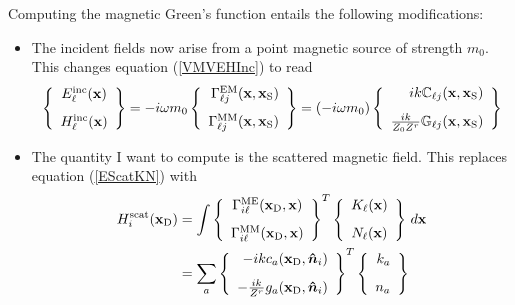 \documentclass[letterpaper]{article}
\begin{document}
Computing the magnetic Green's function entails the following
modifications:
\begin{itemize}
 \item The incident fields now arise from a point magnetic source
       of strength $m_0$. This changes equation (\ref{VMVEHInc})
       to read
$$
 \left\{\begin{array}{c}
 E_\ell^{\text{\scriptsize inc}}(\mathbf{x}) \\[8pt]
 H_\ell^{\text{\scriptsize inc}}(\mathbf{x})
 \end{array}\right\}
= -i\omega m_0
  \left\{\begin{array}{r}
   \Gamma_{\ell j}^{\text{\scriptsize EM}}(\mathbf{x}, \mathbf{x}_{\text{\scriptsize S}}) \\[8pt]
   \Gamma_{\ell j}^{\text{\scriptsize MM}}(\mathbf{x}, \mathbf{x}_{\text{\scriptsize S}})
  \end{array}\right\}
= (-i\omega m_0)
  \left\{\begin{array}{r}
     ik \mathbb{C}_{\ell j}(\mathbf{x}, \mathbf{x}_{\text{\scriptsize S}}) \\[8pt]
  \frac{ik}{Z_0 Z^r} \mathbb{G}_{\ell j}(\mathbf{x}, \mathbf{x}_{\text{\scriptsize S}})
  \end{array}\right\}
$$
 \item The quantity I want to compute is the scattered magnetic
       field. This replaces equation (\ref{EScatKN}) with
\begin{align}
 H_i^{\text{\scriptsize scat}}(\mathbf{x}_{\text{\scriptsize D}})
&=\int 
  \left\{\begin{array}{c}
   \Gamma_{i \ell}^{\text{\scriptsize ME}}(\mathbf{x}_{\text{\scriptsize D}}, \mathbf{x}) 
   \\[8pt]
   \Gamma_{i \ell}^{\text{\scriptsize MM}}(\mathbf{x}_{\text{\scriptsize D}}, \mathbf{x}) 
  \end{array}\right\}^T
  \left\{\begin{array}{c}
   K_\ell(\mathbf{x}) 
   \\[8pt]
   N_\ell(\mathbf{x})
  \end{array}\right\}
  \, d\mathbf{x}
\\
&= \sum_{a}
  \left\{\begin{array}{r}
  -ik c_a(\mathbf{x}_{\text{\scriptsize D}}, \boldsymbol{\hat{n}}_i)
   \\[8pt]
  -\frac{ik}{Z^r} g_a(\mathbf{x}_{\text{\scriptsize D}}, \boldsymbol{\hat{n}}_i)
  \end{array}\right\}^T
  \left\{\begin{array}{r}
   k_a 
   \\[8pt]
   n_a
  \end{array}\right\}
\label{HScatKN}
\end{align}
\end{itemize}
\end{document}
